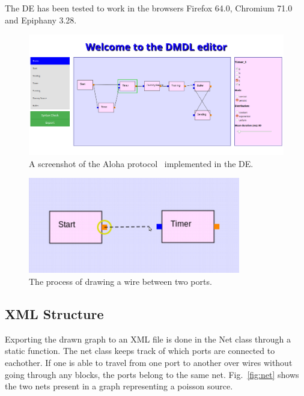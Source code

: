 \documentclass[journal,comsoc]{IEEEtran}
\begin{document}
The DE has been tested to work in the browsers Firefox 64.0, Chromium 71.0 and Epiphany 3.28.

\begin{figure}[!t]
    \centering
    \includegraphics[width=\columnwidth]{full_editor.png}
    \caption{A screenshot of the Aloha protocol~\cite{aloha} implemented in the DE.}
    \label{fig:full_editor}
\end{figure}

\begin{figure}[!t]
    \centering
    \includegraphics[width=\columnwidth]{wiring.png}
    \caption{The process of drawing a wire between two ports.}
    \label{fig:wiring}
\end{figure}

\subsection{XML Structure}
\label{sec:xml}
Exporting the drawn graph to an XML file is done in the Net class through a static function.
The net class keeps track of which ports are connected to eachother. If one is able to
travel from one port to another over wires without going through any blocks, the ports
belong to the same net. Fig.~\ref{fig:net} shows the two nets present in a graph representing
a poisson source.
\end{document}
